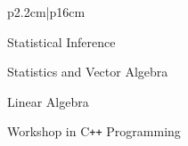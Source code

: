 \documentclass[10pt, oneside]{article}
\begin{document}
\begin{tabularx}{\linewidth}{p{2.2cm}|p{16cm}}
\begin{itemize}
\begin{minipage}{0.3\linewidth}
			\end{minipage}
			\begin{minipage}{0.4\linewidth}
				\item Statistical Inference
				\item Statistics and Vector Algebra
				\item Linear Algebra
				\item Workshop in C\texttt{++} Programming
			\end{minipage}
		\end{itemize}






\end{tabularx}
\end{document}
